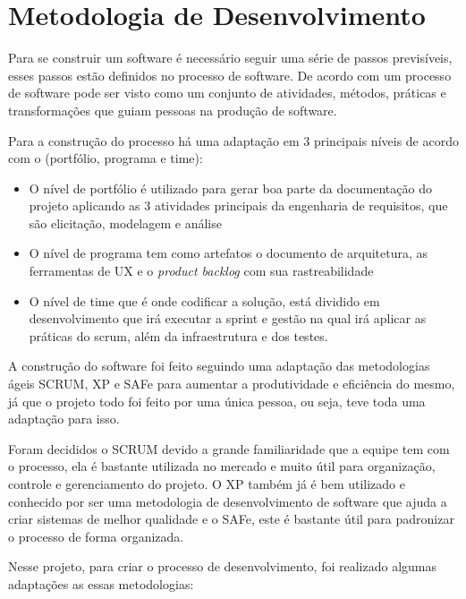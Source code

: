 \section{Metodologia de Desenvolvimento}

Para se construir um software é necessário seguir uma série de passos previsíveis, esses passos estão definidos no
processo de software. De acordo com \cite{pressman} um processo de software pode ser visto como um conjunto de atividades, métodos, práticas e transformações que guiam pessoas na produção de software.

Para a construção do processo há uma adaptação em 3 principais níveis de acordo com o \cite{safe} (portfólio, programa e time):

\begin{itemize}
  \item O nível de portfólio é utilizado para gerar boa parte da documentação do projeto aplicando as 3 atividades principais da engenharia de requisitos, que são elicitação, modelagem e análise
  \item O nível de programa tem como artefatos o documento de arquitetura, as ferramentas de UX e o \textit{product backlog} com sua rastreabilidade
  \item O nível de time que é onde codificar a solução, está dividido em desenvolvimento que irá executar a sprint e gestão na qual irá aplicar as práticas do scrum, além da infraestrutura e dos testes.
\end{itemize}

A construção do software foi feito seguindo uma adaptação das metodologias ágeis SCRUM, XP e SAFe para aumentar a produtividade e eficiência do mesmo, já que o projeto todo foi feito por uma única pessoa, ou seja, teve toda uma adaptação para isso.

Foram decididos o SCRUM devido a grande familiaridade que a equipe tem com o processo, ela é bastante utilizada no mercado e muito útil para organização, controle e gerenciamento do projeto. O XP também já é bem utilizado e conhecido por ser uma metodologia de desenvolvimento de software que ajuda a criar sistemas de melhor qualidade e o SAFe, este é bastante útil para padronizar o processo de forma organizada.

Nesse projeto, para criar o processo de desenvolvimento, foi realizado algumas adaptações as essas metodologias:

